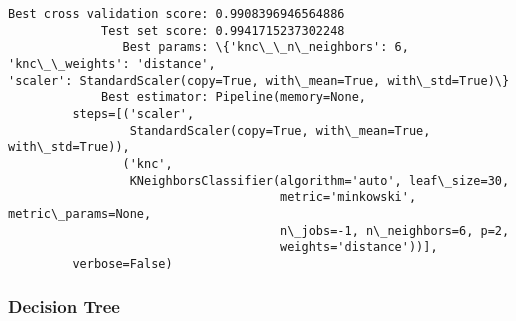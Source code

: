 \documentclass[11pt]{article}
\begin{document}
    \begin{Verbatim}[commandchars=\\\{\}]
Best cross validation score: 0.9908396946564886
             Test set score: 0.9941715237302248
                Best params: \{'knc\_\_n\_neighbors': 6, 'knc\_\_weights': 'distance',
'scaler': StandardScaler(copy=True, with\_mean=True, with\_std=True)\}
             Best estimator: Pipeline(memory=None,
         steps=[('scaler',
                 StandardScaler(copy=True, with\_mean=True, with\_std=True)),
                ('knc',
                 KNeighborsClassifier(algorithm='auto', leaf\_size=30,
                                      metric='minkowski', metric\_params=None,
                                      n\_jobs=-1, n\_neighbors=6, p=2,
                                      weights='distance'))],
         verbose=False)
\end{Verbatim}

    \hypertarget{decision-tree}{%
\subsubsection{Decision Tree}\label{decision-tree}}
\end{document}
